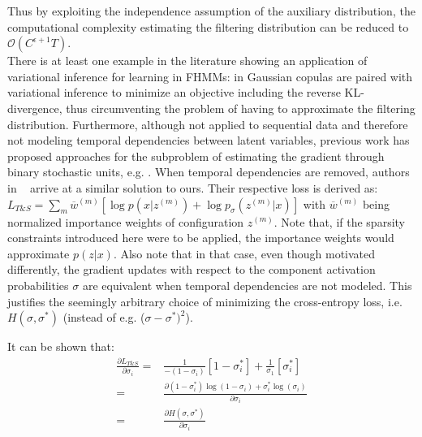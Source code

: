 Thus by exploiting the independence assumption of the auxiliary distribution, the computational complexity estimating the filtering distribution can be reduced to $\mathcal{O}(C^{\epsilon+1} T)$.\\
There is at least one example in the literature showing an application of variational inference for learning in FHMMs: in \cite{ng2016scaling} Gaussian copulas are paired with variational inference to minimize an objective including the reverse KL-divergence, thus circumventing the problem of having to approximate the filtering distribution. Furthermore, although not applied to sequential data and therefore not modeling temporal dependencies between latent variables, previous work has proposed approaches for the subproblem of estimating the gradient through binary stochastic units, e.g. \cite{raiko2014techniques,bengio2013estimating}. When temporal dependencies are removed, authors in ~\cite{tang2013learning} arrive at a similar solution to ours. Their respective loss is derived as: $L_{T\&S} = \sum_m \overline{w}^{(m)}[\log p(x|z^{(m)}) + \log p_{\sigma}(z^{(m)}|x)]$ with $\overline{w}^{(m)}$ being normalized importance weights of configuration $z^{(m)}$. Note that, if the sparsity constraints introduced here were to be applied, the importance weights would approximate $p(z|x)$. Also note that in that case, even though motivated differently, the gradient updates with respect to the component activation probabilities $\sigma$ are equivalent when temporal dependencies are not modeled. This justifies the seemingly arbitrary choice of minimizing the cross-entropy loss, i.e. $H(\sigma, \sigma^*)$ (instead of e.g. ($\sigma - \sigma^*)^2$). 

It can be shown that:
\begin{align*}
\frac{\partial L_{T\&S}}{\partial \sigma_i}=& \frac{1}{-(1-\sigma_i)}[1-\sigma_i^*]+ \frac{1}{\sigma_1}[\sigma_i^*]\\
 =&  \frac{\partial (1-\sigma_i^*)\log(1-\sigma_i) + \sigma_i^*\log(\sigma_i)}{\partial \sigma_i} \\
 =&  \frac{\partial H(\sigma, \sigma^*)}{\partial \sigma_i} 
\end{align*}

